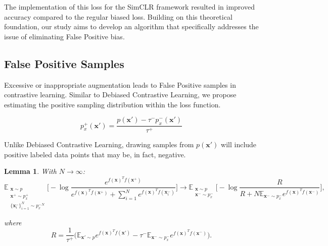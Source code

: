 \documentclass{article}
\begin{document}
The implementation of this loss for the SimCLR framework resulted in improved accuracy compared to the regular biased loss. Building on this theoretical foundation, our study aims to develop an algorithm that specifically addresses the issue of eliminating False Positive bias.

\subsection{False Positive Samples} \label{FP}
Excessive or inappropriate augmentation leads to False Positive samples in contrastive learning. Similar to Debiased Contrastive Learning, we propose estimating the positive sampling distribution within the loss function.

\begin{equation}  \label{eq:8}
p_x^+ (\textbf{x}') = \frac{p(\textbf{x}') - \tau^- p^-_x(\textbf{x}')}{\tau^+}
\end{equation}

Unlike Debiased Contrastive Learning, drawing samples from $p(\textbf{x}')$ will include positive labeled data points that may be, in fact, negative.

\newtheorem{theorem}{Theorem}
\newtheorem{lemma}[theorem]{Lemma}

\begin{lemma}
With $N \to \infty$:
\begin{equation} \label{eq:9}
\mathbb{E}_{\substack{\textbf{x} \sim p \\ \textbf{x}^+ \sim p_x^+ \\ \{\textbf{x}_i^-\}_{i=1}^N \sim {p_x^-}^N}} \bigg[ - \log \frac{e^{f(\textbf{x})^T f(\textbf{x}^+)}}{e^{f(\textbf{x})^T f(\textbf{x}^+)} + \sum_{i=1}^N e^{f(\textbf{x})^T f(\textbf{x}_i^-)}} \bigg] \longrightarrow
\mathbb{E}_{\substack{\textbf{x} \sim p \\ \textbf{x}^- \sim p_x^-}} \bigg[ - \log \frac{R}{R + N \mathbb{E}_{\textbf{x}^- \sim p_x^-} e^{f(\textbf{x})^T f(\textbf{x}^-)}} \bigg],
\end{equation}

where
\begin{equation}  \label{eq:10}
R = \frac{1}{\tau^+} \big(\mathbb{E}_{\textbf{x}' \sim p} e^{f(\textbf{x})^T f(\textbf{x}')} - \tau^- \mathbb{E}_{\textbf{x}^- \sim p_x^-} e^{f(\textbf{x})^T f(\textbf{x}^-)}\big).
\end{equation}
\end{lemma}
\end{document}
